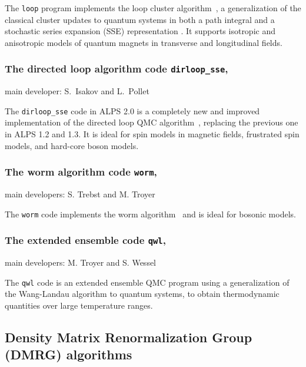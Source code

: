 \documentclass[12pt]{iopart}
\begin{document}
\smallskip

\noindent The {\tt loop} program implements the loop cluster
algorithm~\cite{Evertz93,Todo01,looper, Evertz03}, a generalization of the classical cluster updates \cite{Swendsen87,Wolff89} to quantum systems in both a path integral and a stochastic series expansion (SSE) representation \cite{Sandvik91,Sandvik99}. It supports isotropic and anisotropic models of quantum magnets in transverse and longitudinal fields.


\subsubsection{The directed loop algorithm code {\tt dirloop\_sse},} main developer: S.~Isakov and L.~Pollet

\smallskip

\noindent The {\tt dirloop\_sse} code in ALPS 2.0 is a completely new and improved implementation of the directed loop QMC algorithm~\cite{Sylyuasen,Alet2005}, replacing the previous one in ALPS 1.2 and 1.3.  It is ideal for spin models in magnetic fields, frustrated spin models, and hard-core boson models.
 
\subsubsection{The worm algorithm code {\tt worm},} main developers: S. Trebst and M. Troyer

\smallskip

\noindent The {\tt worm} code implements the worm algorithm~\cite{Prokofev98A} and is ideal for bosonic models.


\subsubsection{The extended ensemble code {\tt qwl},} main developers: M. Troyer and S. Wessel

\smallskip

\noindent The {\tt qwl} code is an extended ensemble QMC program using a generalization of the Wang-Landau\cite{Wang01,Wang01b} algorithm to quantum systems,\cite{Troyer03} to obtain thermodynamic quantities over large temperature ranges.

 
\subsection{Density Matrix Renormalization Group (DMRG) algorithms} 
\end{document}
